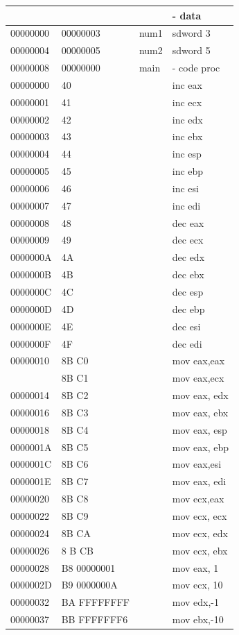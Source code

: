 \documentclass[10pt]{book}
\begin{document}
\begin{center}
\begin{tabular}{|l|l|l|l|}
\hline
 &  &  & - data \\
\hline
00000000 & 00000003 & num1 & sdword 3 \\
\hline
00000004 & 00000005 & num2 & sdword 5 \\
\hline
00000008 & 00000000 & main & - code proc \\
\hline
00000000 & 40 &  & inc eax \\
\hline
00000001 & 41 &  & inc ecx \\
\hline
00000002 & 42 &  & inc edx \\
\hline
00000003 & 43 &  & inc ebx \\
\hline
00000004 & 44 &  & inc esp \\
\hline
00000005 & 45 &  & inc ebp \\
\hline
00000006 & 46 &  & inc esi \\
\hline
00000007 & 47 &  & inc edi \\
\hline
00000008 & 48 &  & dec eax \\
\hline
00000009 & 49 &  & dec ecx \\
\hline
0000000A & 4A &  & dec edx \\
\hline
0000000B & 4B &  & dec ebx \\
\hline
0000000C & 4C &  & dec esp \\
\hline
0000000D & 4D &  & dec ebp \\
\hline
0000000E & 4E &  & dec esi \\
\hline
0000000F & 4F &  & dec edi \\
\hline
00000010 & 8B C0 &  & mov eax,eax \\\index{.lst ﬁle}
\hline
00000012 & 8B C1 &  & mov eax,ecx \\
\hline
00000014 & 8B C2 &  & mov eax, edx \\
\hline
00000016 & 8B C3 &  & mov eax, ebx \\
\hline
00000018 & 8B C4 &  & mov eax, esp \\
\hline
0000001A & 8B C5 &  & mov eax, ebp \\
\hline
0000001C & 8B C6 &  & mov eax,esi \\
\hline
0000001E & 8B C7 &  & mov eax, edi \\
\hline
00000020 & 8B C8 &  & mov ecx,eax \\
\hline
00000022 & 8B C9 &  & mov ecx, ecx \\
\hline
00000024 & 8B CA &  & mov ecx, edx \\
\hline
00000026 & 8 B CB &  & mov ecx, ebx \\
\hline
00000028 & B8 00000001 &  & mov eax, 1 \\
\hline
0000002D & B9 0000000A &  & mov ecx, 10 \\
\hline
00000032 & BA FFFFFFFF &  & mov edx,-1 \\
\hline
00000037 & BB FFFFFFF6 &  & mov ebx,-10 \\
\hline
\end{tabular}
\end{center}
\end{document}
